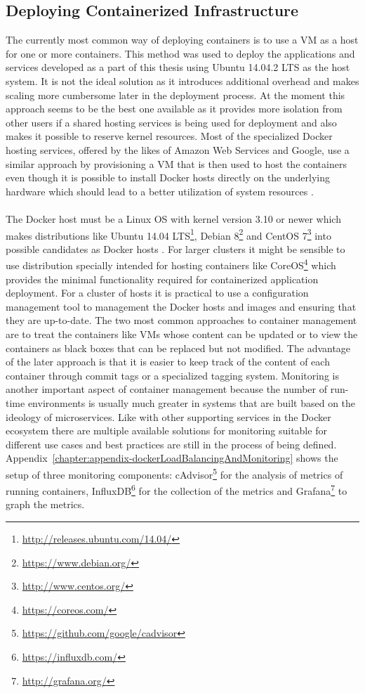 \subsection{Deploying Containerized Infrastructure}

The currently most common way of deploying containers is to use a VM as a host for one or more containers. This method was used to deploy the applications and services developed as a part of this thesis using Ubuntu 14.04.2 LTS as the host system. It is not the ideal solution as it introduces additional overhead and makes scaling more cumbersome later in the deployment process. At the moment this approach seems to be the best one available as it provides more isolation from other users if a shared hosting services is being used for deployment and also makes it possible to reserve kernel resources. Most of the specialized Docker hosting services, offered by the likes of Amazon Web Services and Google, use a similar approach by provisioning a VM that is then used to host the containers even though it is possible to install Docker hosts directly on the underlying hardware which should lead to a better utilization of system resources \cite{mouat2015docker}.
\\ \\
The Docker host must be a Linux OS with kernel version 3.10 or newer which makes distributions like Ubuntu 14.04 LTS\footnote{\url{http://releases.ubuntu.com/14.04/}}, Debian 8\footnote{\url{https://www.debian.org/}} and CentOS 7\footnote{\url{http://www.centos.org/}} into possible candidates as Docker hosts \cite{dockerBinaries}. For larger clusters it might be sensible to use distribution specially intended for hosting containers like CoreOS\footnote{\url{https://coreos.com/}} which provides the minimal functionality required for containerized application deployment. For a cluster of hosts it is practical to use a configuration management tool to management the Docker hosts and images and ensuring that they are up-to-date. The two most common approaches to container management are to treat the containers like VMs whose content can be updated or to view the containers as black boxes that can be replaced but not modified. The advantage of the later approach is that it is easier to keep track of the content of each container through commit tags or a specialized tagging system. Monitoring is another important aspect of container management because the number of run-time environments is usually much greater in systems that are built based on the ideology of microservices. Like with other supporting services in the Docker ecosystem there are multiple available solutions for monitoring suitable for different use cases and best practices are still in the process of being defined. Appendix~\ref{chapter:appendix-dockerLoadBalancingAndMonitoring} shows the setup of three monitoring components: cAdvisor\footnote{\url{https://github.com/google/cadvisor}} for the analysis of metrics of running containers, InfluxDB\footnote{\url{https://influxdb.com/}} for the collection of the metrics and Grafana\footnote{\url{http://grafana.org/}} to graph the metrics. 

